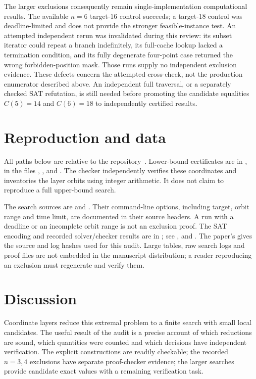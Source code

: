 \documentclass[11pt,a4paper]{article}
\begin{document}
The larger exclusions consequently remain single-implementation computational results. The available $n=6$ target-$16$ control succeeds; a target-$18$ control was deadline-limited and does not provide the stronger feasible-instance test. An attempted independent rerun was invalidated during this review: its subset iterator could repeat a branch indefinitely, its full-cache lookup lacked a termination condition, and its fully degenerate four-point case returned the wrong forbidden-position mask. Those runs supply no independent exclusion evidence. These defects concern the attempted cross-check, not the production enumerator described above. An independent full traversal, or a separately checked SAT refutation, is still needed before promoting the candidate equalities $C(5)=14$ and $C(6)=18$ to independently certified results.

\section{Reproduction and data}\label{sec:data}
All paths below are relative to the repository~\cite{repository}. Lower-bound certificates are in , in the files , ,  and . The checker  independently verifies these coordinates and inventories the layer orbits using integer arithmetic. It does not claim to reproduce a full upper-bound search.

The search sources are  and . Their command-line options, including target, orbit range and time limit, are documented in their source headers. A run with a deadline or an incomplete orbit range is not an exclusion proof. The SAT encoding and recorded solver/checker results are in ; see ,  and . The paper's  gives the source and log hashes used for this audit. Large tables, raw search logs and proof files are not embedded in the manuscript distribution; a reader reproducing an exclusion must regenerate and verify them.

\section{Discussion}
Coordinate layers reduce this extremal problem to a finite search with small local candidates. The useful result of the audit is a precise account of which reductions are sound, which quantities were counted and which decisions have independent verification. The explicit constructions are readily checkable; the recorded $n=3,4$ exclusions have separate proof-checker evidence; the larger searches provide candidate exact values with a remaining verification task.
\end{document}
